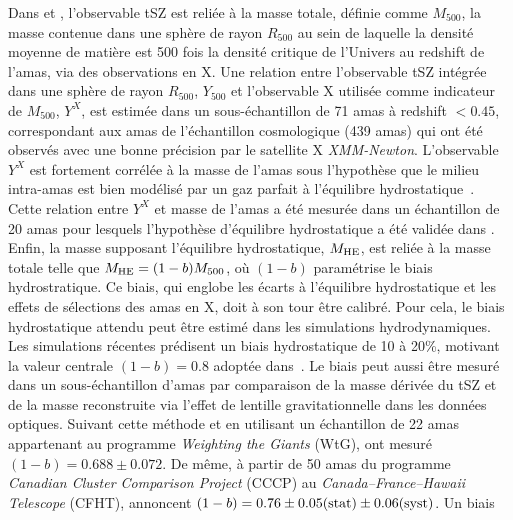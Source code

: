 Dans \citet{Planck_2014_SZ_Cosmo} et \citet{Planck_2016_SZ_cosmo},
l'observable tSZ est reliée à la masse totale, définie comme
$M_{500}$, la masse contenue dans une sphère de rayon $R_{500}$ au
sein de laquelle la densité moyenne de matière est 500 fois la
densité critique de l'Univers au redshift de l'amas, via des
observations en X. 
Une relation entre l'observable tSZ intégrée dans une sphère de rayon
$R_{500}$, $Y_{500}$ et l'observable X utilisée comme indicateur de 
$M_{500}$, $Y^{X}$, est estimée dans un sous-échantillon de 71 amas à
redshift $<0.45$, correspondant aux amas de l'échantillon cosmologique
(439 amas) qui ont été observés avec une bonne précision par le satellite
X \emph{XMM-Newton}. L'observable $Y^{X}$ est fortement corrélée à la
masse de l'amas sous l'hypothèse que le milieu intra-amas est bien
modélisé par un gaz parfait à l'équilibre
hydrostatique~\citep{Kravtsov2006}. Cette relation entre $Y^{X}$ et
masse de l'amas a été mesurée dans un échantillon de 20 amas pour lesquels
l'hypothèse d'équilibre hydrostatique a été validée dans \citet{Arnaud2010}.
Enfin, la masse supposant l'équilibre hydrostatique, $M_{\rm{HE}}$,
est reliée à la masse totale telle que $M_{\rm{HE}} = (1-b)M_{500}$,
où $(1-b)$ paramétrise le biais hydrostratique. Ce biais, qui englobe les écarts à
l'équilibre hydrostatique et les effets de sélections des amas en X, doit à son
tour être calibré. Pour cela, le biais hydrostatique attendu peut être
estimé dans les simulations hydrodynamiques. Les simulations récentes
prédisent un biais hydrostatique de 10 à 20\%, motivant la valeur
centrale $(1 - b) = 0.8$ adoptée dans~\citet{Planck_2014_SZ_Cosmo}. Le
biais peut aussi être mesuré dans un sous-échantillon d'amas par
comparaison de la masse dérivée du tSZ et de la masse reconstruite via
l'effet de lentille gravitationnelle dans les données
optiques. Suivant cette méthode et en utilisant un échantillon de 22
amas appartenant au programme \emph{Weighting the Giants}
(WtG), \citet{vonderLinden2014} ont mesuré $(1-b) = 0.688 \pm
0.072$. De même, à partir de 50 amas du programme \emph{Canadian
Cluster Comparison Project} (CCCP) au \emph{Canada–France–Hawaii
Telescope} (CFHT), \citet{Hoekstra2015} annoncent
$(1-b) = 0.76 \pm 0.05\rm{(stat)} \pm 0.06\rm{(syst)}$. Un biais
